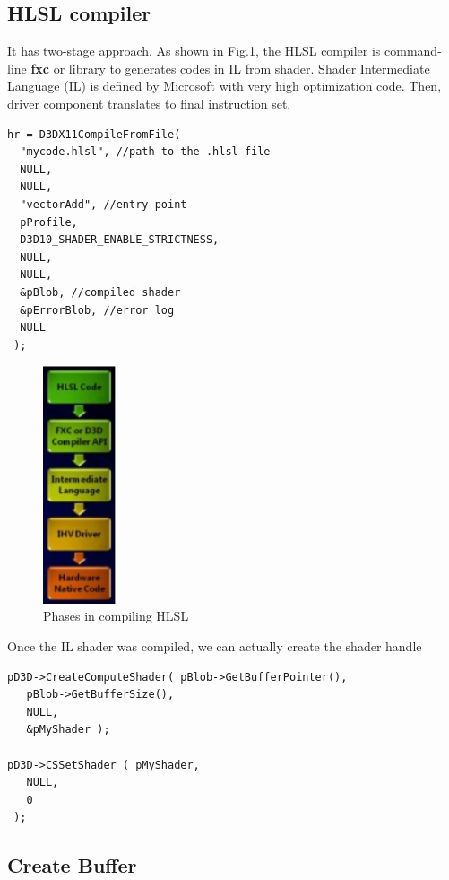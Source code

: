 \subsection{HLSL compiler}

It has two-stage approach. As shown in Fig.\ref{fig:HLSL_compile}, the HLSL
compiler is command-line {\bf fxc} or library to generates codes in IL
from shader. Shader Intermediate Language (IL) is defined by Microsoft with very
high optimization code.  Then, driver component translates to final instruction set.

\begin{verbatim}
hr = D3DX11CompileFromFile(
  "mycode.hlsl", //path to the .hlsl file
  NULL,
  NULL,
  "vectorAdd", //entry point
  pProfile,
  D3D10_SHADER_ENABLE_STRICTNESS,
  NULL,
  NULL,
  &pBlob, //compiled shader
  &pErrorBlob, //error log
  NULL
 );

\end{verbatim}

\begin{figure}[hbt]
  \centerline{\includegraphics[height=7cm,
    angle=0]{./images/HLSL_compile-stages.eps}}
  \caption{Phases in compiling HLSL}
  \label{fig:HLSL_compile}
\end{figure}

Once the IL shader was compiled, we can actually create the shader handle
\begin{verbatim}
pD3D->CreateComputeShader( pBlob->GetBufferPointer(),
   pBlob->GetBufferSize(),
   NULL,
   &pMyShader );

pD3D->CSSetShader ( pMyShader,
   NULL,
   0
 );
\end{verbatim}

\subsection{Create Buffer}  

